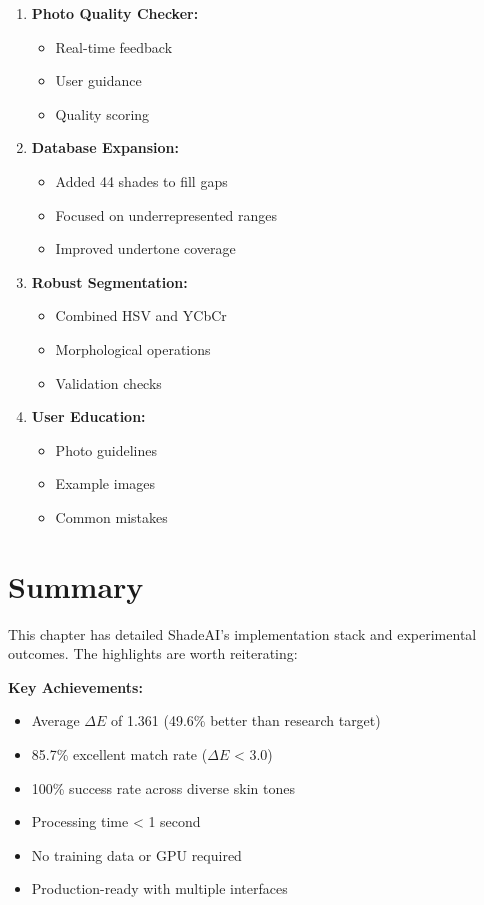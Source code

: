 \begin{enumerate}
    \item \textbf{Photo Quality Checker:}
    \begin{itemize}
        \item Real-time feedback
        \item User guidance
        \item Quality scoring
    \end{itemize}
    
    \item \textbf{Database Expansion:}
    \begin{itemize}
        \item Added 44 shades to fill gaps
        \item Focused on underrepresented ranges
        \item Improved undertone coverage
    \end{itemize}
    
    \item \textbf{Robust Segmentation:}
    \begin{itemize}
        \item Combined HSV and YCbCr
        \item Morphological operations
        \item Validation checks
    \end{itemize}
    
    \item \textbf{User Education:}
    \begin{itemize}
        \item Photo guidelines
        \item Example images
        \item Common mistakes
    \end{itemize}
\end{enumerate}

\section{Summary}

This chapter has detailed ShadeAI's implementation stack and experimental outcomes. The highlights are worth reiterating:

\textbf{Key Achievements:}
\begin{itemize}
    \item Average $\Delta E$ of 1.361 (49.6\% better than research target)
    \item 85.7\% excellent match rate ($\Delta E$ < 3.0)
    \item 100\% success rate across diverse skin tones
    \item Processing time < 1 second
    \item No training data or GPU required
    \item Production-ready with multiple interfaces
\end{itemize}

